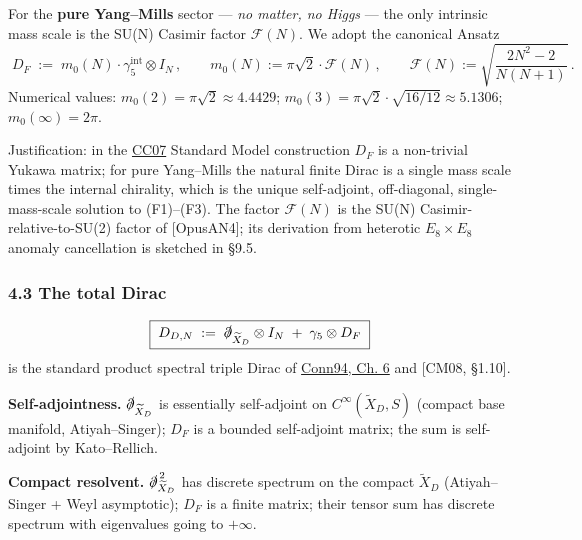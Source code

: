\documentclass[
  11pt,
  a4paper,
]{amsart}
\begin{document}
For the \textbf{pure Yang--Mills} sector --- \emph{no matter, no Higgs} --- the only intrinsic
mass scale is the SU(N) Casimir factor \(\mathcal{F}(N)\). We adopt the canonical
Ansatz
\begin{equation}\label{eq:DF}
\boxed{\;D_F \;:=\; m_0(N) \cdot \gamma_5^{\mathrm{int}} \otimes I_N\,, \qquad m_0(N) := \pi\sqrt{2}\cdot \mathcal{F}(N)\,, \qquad \mathcal{F}(N) := \sqrt{\frac{2N^2 - 2}{N(N+1)}}\,.\;}
\end{equation}
Numerical values: \(m_0(2) = \pi\sqrt{2} \approx 4.4429\);
\(m_0(3) = \pi\sqrt{2}\cdot\sqrt{16/12} \approx 5.1306\); \(m_0(\infty) = 2\pi\).

Justification: in the \href{Standard\%20Model\%20spectral\%20triple\%20on\%20$/mathbb\%7BR\%7D\%5E4\%20/otimes\%20/mathcal\%7BA\%7D_F$}{CC07} Standard Model construction \(D_F\) is a non-trivial
Yukawa matrix; for pure Yang--Mills the natural finite Dirac is a single mass
scale times the internal chirality, which is the unique self-adjoint, off-diagonal,
single-mass-scale solution to (F1)--(F3). The factor \(\mathcal{F}(N)\) is the SU(N)
Casimir-relative-to-SU(2) factor of {[}OpusAN4{]}; its derivation from heterotic
\(E_8 \times E_8\) anomaly cancellation is sketched in §9.5.

\hypertarget{the-total-dirac}{%
\subsubsection{4.3 The total Dirac}\label{the-total-dirac}}

\begin{equation}\label{eq:Dtotal}
\boxed{\;D_{D,N} \;:=\; \slashed{\partial}_{\widetilde{X}_D} \otimes I_N \;+\; \gamma_5 \otimes D_F\;}
\end{equation}
is the standard product spectral triple Dirac of \href{spectral\%20triples\%20on\%20smooth\%20Riemannian\%20manifolds\%20tensored}{Conn94, Ch. 6} and {[}CM08, §1.10{]}.

\textbf{Self-adjointness.} \(\slashed{\partial}_{\widetilde{X}_D}\) is essentially
self-adjoint on \(C^\infty(\widetilde{X}_D, S)\) (compact base manifold,
Atiyah--Singer); \(D_F\) is a bounded self-adjoint matrix; the sum is self-adjoint
by Kato--Rellich.

\textbf{Compact resolvent.} \(\slashed{\partial}_{\widetilde{X}_D}^{\,2}\) has discrete
spectrum on the compact \(\widetilde{X}_D\) (Atiyah--Singer + Weyl asymptotic);
\(D_F\) is a finite matrix; their tensor sum has discrete spectrum with
eigenvalues going to \(+\infty\).
\end{document}
